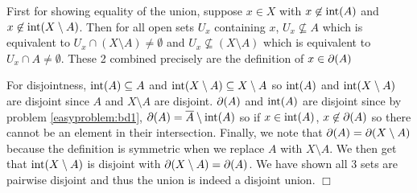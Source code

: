 \documentclass{article}
\begin{document}
 {
    First for showing equality of the union, suppose $x\in X$ with $x\not\in \operatorname{int}(A)$ and $x\not\in \operatorname{int}(X\setminus A)$. Then for all open sets $U_{x}$ containing $x$, $U_{x}\not\subseteq A$ which is equivalent to $U_{x}\cap(X\setminus A)\neq \emptyset$ and $U_{x}\not\subseteq (X\setminus A)$ which is equivalent to $U_{x}\cap A\neq \emptyset$. These 2 combined precisely are the definition of $x\in \partial(A)$

    For disjointness, $\operatorname{int}(A)\subseteq A$ and $\operatorname{int}(X\setminus A)\subseteq X\setminus A$ so $\operatorname{int}(A)$ and $\operatorname{int}(X\setminus A)$ are disjoint since $A$ and $X\setminus A$ are disjoint. $\partial(A)$ and $\operatorname{int}(A)$ are disjoint since by problem \ref{easyproblem:bd1}, $\partial(A) =  \overline{A} \setminus \operatorname{int}(A)$ so if $x\in \operatorname{int}(A)$, $x\not\in \partial(A)$ so there cannot be an element in their intersection. Finally, we note that $\partial(A) = \partial(X\setminus A)$ because the definition is symmetric when we replace $A$ with $X\setminus A$. We then get that $\operatorname{int}(X\setminus A)$ is disjoint with $\partial(X\setminus A) = \partial(A)$. We have shown all 3 sets are pairwise disjoint and thus the union is indeed a disjoint union. $\Box$
}
\end{document}
